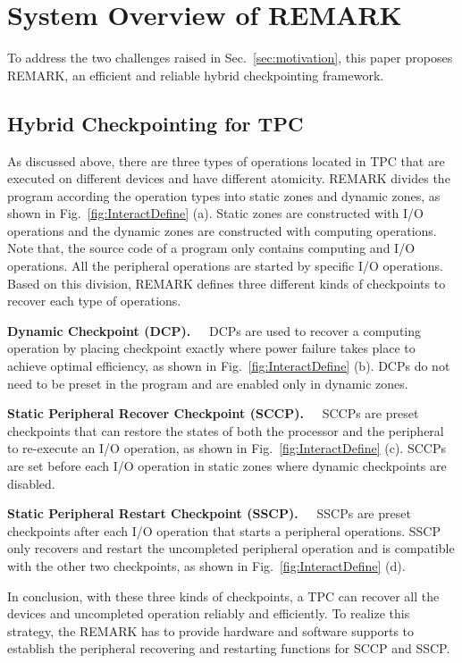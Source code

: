 \section{System Overview of REMARK} \label{sec:system}
%
To address the two challenges raised in Sec.~\ref{sec:motivation}, this paper proposes REMARK, an efficient and reliable hybrid checkpointing framework. 

\subsection{Hybrid Checkpointing for TPC}   \label{sec:sysHybridCP}
%
As discussed above, there are three types of operations located in TPC that are executed on different devices and have different atomicity.
REMARK divides the program according the operation types into static zones and dynamic zones, as shown in Fig.~\ref{fig:InteractDefine} (a).
Static zones are constructed with I/O operations and the dynamic zones are constructed with computing operations.
Note that, the source code of a program only contains computing and I/O operations. 
All the peripheral operations are started by specific I/O operations.
Based on this division, REMARK defines three different kinds of checkpoints to recover each type of operations.

\noindent\textbf{Dynamic Checkpoint (DCP).\ \ }
%
DCPs are used to recover a computing operation by placing checkpoint exactly where power failure takes place to achieve optimal efficiency, as shown in Fig.~\ref{fig:InteractDefine} (b).
DCPs do not need to be preset in the program and are enabled only in dynamic zones.

\noindent\textbf{Static Peripheral Recover Checkpoint (SCCP).\ \ }
%
SCCPs are preset checkpoints that can restore the states of both the processor and the peripheral to re-execute an I/O operation, as shown in Fig.~\ref{fig:InteractDefine} (c).
SCCPs are set before each I/O operation in static zones where dynamic checkpoints are disabled.

\noindent\textbf{Static Peripheral Restart Checkpoint (SSCP).\ \ }
SSCPs are preset checkpoints after each I/O operation that starts a peripheral operations.
SSCP only recovers and restart the uncompleted peripheral operation and is compatible with the other two checkpoints, as shown in Fig.~\ref{fig:InteractDefine} (d).

In conclusion, with these three kinds of checkpoints, a TPC can recover all the devices and uncompleted operation reliably and efficiently. 
To realize this strategy, the REMARK has to provide hardware and software supports to establish the peripheral recovering and restarting functions for SCCP and SSCP.

